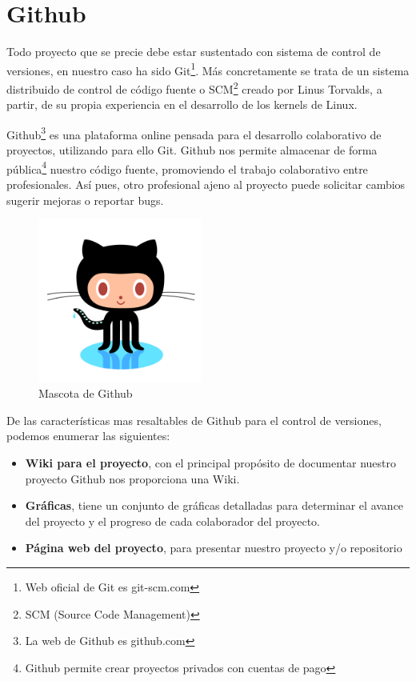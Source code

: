 \section{Github}


Todo proyecto que se precie debe estar sustentado con sistema de control de versiones, en nuestro caso ha sido Git\footnote{Web oficial de Git es git-scm.com}. Más concretamente se trata de un sistema distribuido de control de código fuente o SCM\footnote{SCM (Source Code Management)} creado por Linus Torvalds, a partir, de su propia experiencia en el desarrollo de los kernels de Linux. 

Github\footnote{La web de Github es github.com} es una plataforma online pensada para el desarrollo colaborativo de proyectos, utilizando para ello Git. Github nos permite almacenar de forma pública\footnote{Github permite crear proyectos privados con cuentas de pago} nuestro código fuente, promoviendo el trabajo colaborativo entre profesionales. Así pues, otro profesional ajeno al proyecto puede solicitar cambios sugerir mejoras o reportar bugs.

\begin{figure}
  \begin{center}
    \includegraphics[width=0.48\textwidth]{imagenes/octocat}
  \end{center}
  \caption{Mascota de Github}
	\label{fig:octocat}
\end{figure}

De las características mas resaltables de Github para el control de versiones, podemos enumerar las siguientes:
\begin{itemize}
\item \textbf{Wiki para el proyecto}, con el principal propósito de documentar nuestro proyecto Github nos proporciona una Wiki. 
\item \textbf{Gráficas}, tiene un conjunto de gráficas detalladas para determinar el avance del proyecto y el progreso de cada colaborador del proyecto.
\item \textbf{Página web del proyecto}, para presentar nuestro proyecto y/o repositorio 
\end{itemize}

